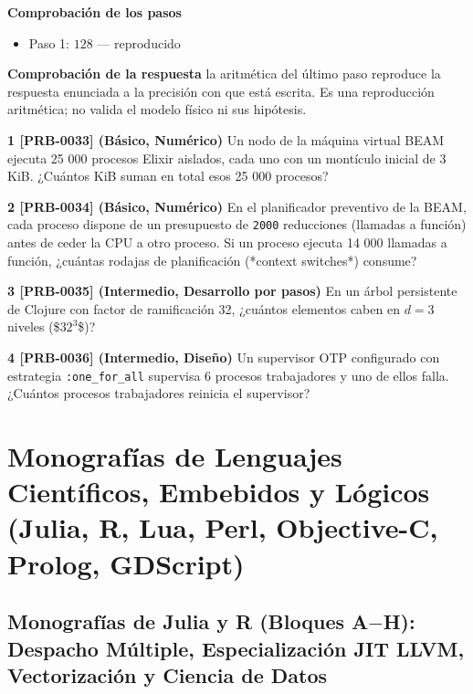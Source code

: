 \documentclass{book}
\begin{document}
\begin{tcolorbox}[title={Problema resuelto}, studiumworked, breakable]
\noindent\textbf{Comprobación de los pasos}
\begin{itemize}
\item Paso 1: $128$ — reproducido
\end{itemize}

\noindent\textbf{Comprobación de la respuesta} la aritmética del último paso reproduce la respuesta enunciada a la precisión con que está escrita. Es una reproducción aritmética; no valida el modelo físico ni sus hipótesis.
\end{tcolorbox}

\begin{tcolorbox}[title={Ejercicios}, studiumworked, breakable]

\noindent\textbf{1 [PRB-0033] (Básico, Numérico)}
Un nodo de la máquina virtual BEAM ejecuta 25 000 procesos Elixir aislados, cada uno con un montículo inicial de 3 KiB. ¿Cuántos KiB suman en total esos 25 000 procesos?

\noindent\textbf{2 [PRB-0034] (Básico, Numérico)}
En el planificador preventivo de la BEAM, cada proceso dispone de un presupuesto de \texttt{2000} reducciones (llamadas a función) antes de ceder la CPU a otro proceso. Si un proceso ejecuta 14 000 llamadas a función, ¿cuántas rodajas de planificación (*context switches*) consume?

\noindent\textbf{3 [PRB-0035] (Intermedio, Desarrollo por pasos)}
En un árbol persistente de Clojure con factor de ramificación 32, ¿cuántos elementos caben en \(d = 3\) niveles (\$\(32^3\)\$)?

\noindent\textbf{4 [PRB-0036] (Intermedio, Diseño)}
Un supervisor OTP configurado con estrategia \texttt{:one\_for\_all} supervisa 6 procesos trabajadores y uno de ellos falla. ¿Cuántos procesos trabajadores reinicia el supervisor?
\end{tcolorbox}

\part{Monografías de Lenguajes Científicos, Embebidos y Lógicos (Julia, R, Lua, Perl, Objective-C, Prolog, GDScript)}

\chapter{Monografías de Julia y R (Bloques A\(-\)H): Despacho Múltiple, Especialización JIT LLVM, Vectorización y Ciencia de Datos}
\label{chap:cap07-monografias-julia-r-computacion-cientifica-estadistica}
\end{document}
